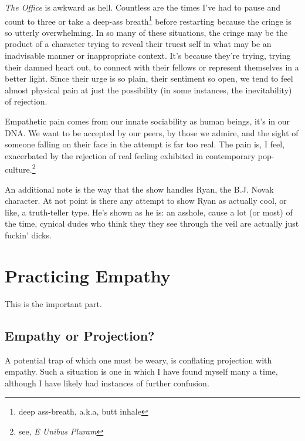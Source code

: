\documentclass[../butidigress.tex]{subfiles}
\begin{document}
\textit{The Office} is awkward as hell.
Countless are the times I've had to pause and count to three or take a deep-ass breath\footnote{deep ass-breath, a.k.a, butt inhale} before restarting because the cringe is so utterly overwhelming.
In so many of these situations, the cringe may be the product of a character trying to reveal their truest self in what may be an inadvisable manner or inappropriate context.
It's because they're trying, trying their damned heart out, to connect with their fellows or represent themselves in a better light.
Since their urge is so plain, their sentiment so open, we tend to feel almost physical pain at just the possibility (in some instances, the inevitability) of rejection.

Empathetic pain comes from our innate sociability as human beings, it's in our DNA.
We want to be accepted by our peers, by those we admire, and the sight of someone falling on their face in the attempt is far too real.
The pain is, I feel, exacerbated by the rejection of real feeling exhibited in contemporary pop-culture.\footnote{see, \textit{E Unibus Pluram}}

An additional note is the way that the show handles Ryan, the B.J. Novak character.
At not point is there any attempt to show Ryan as actually cool, or like, a truth-teller type.
He's shown as he is: an asshole, cause a lot (or most) of the time, cynical dudes who think they they see through the veil are actually just fuckin' dicks.

\section{Practicing Empathy}
This is the important part.


\subsection{Empathy or Projection?}
A potential trap of which one must be weary, is conflating projection with empathy.
Such a situation is one in which I have found myself many a time, although I have likely had instances of further confusion.
\end{document}
